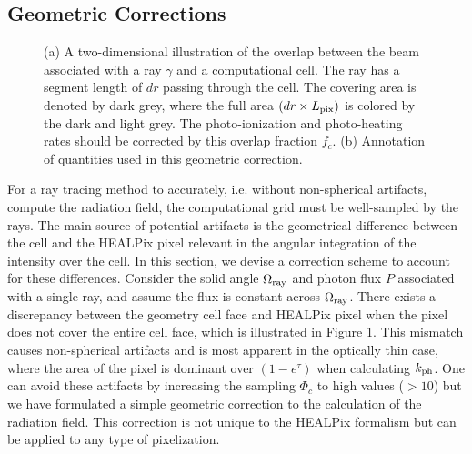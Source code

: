 \documentclass[useAMS,usenatbib]{mn2e}
\begin{document}
\subsection{Geometric Corrections}
\label{sec:meth_fc}

\begin{figure}
  \caption{\label{fig:covering} (a) A two-dimensional illustration of
    the overlap between the beam associated with a ray $\gamma$ and a
    computational cell.  The ray has a segment length of $dr$ passing
    through the cell.  The covering area is denoted by dark grey,
    where the full area $(dr \times L_{\rm pix})$ is colored by the
    dark and light grey.  The photo-ionization and photo-heating rates
    should be corrected by this overlap fraction $f_c$.  (b)
    Annotation of quantities used in this geometric correction.}
\end{figure}

For a ray tracing method to accurately, i.e. without non-spherical
artifacts, compute the radiation field, the computational grid must be
well-sampled by the rays.  The main source of potential artifacts is
the geometrical difference between the cell and the HEALPix pixel
relevant in the angular integration of the intensity over the cell.
In this section, we devise a correction scheme to account for these
differences.  Consider the solid angle $\Omega_{\rm ray}$ and photon
flux $P$ associated with a single ray, and assume the flux is constant
across $\Omega_{\rm ray}$.  There exists a discrepancy between the
geometry cell face and HEALPix pixel when the pixel does not cover the
entire cell face, which is illustrated in Figure \ref{fig:covering}.
This mismatch causes non-spherical artifacts and is most apparent in
the optically thin case, where the area of the pixel is dominant over
$(1 - e^\tau)$ when calculating $k_{\rm ph}$.  One can avoid these
artifacts by increasing the sampling $\Phi_c$ to high values ($>10$)
but we have formulated a simple geometric correction to the
calculation of the radiation field.  This correction is not unique to
the HEALPix formalism but can be applied to any type of pixelization.
\end{document}
